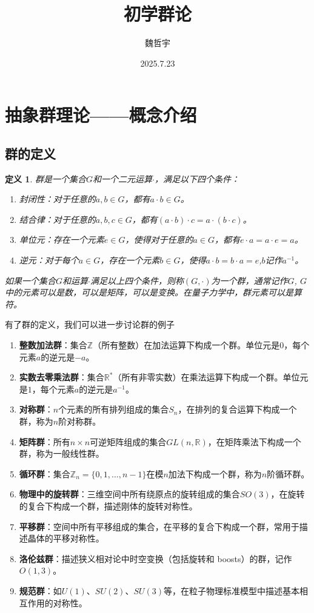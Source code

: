 \documentclass{ctexart}%
\title{初学群论}
\author{魏哲宇}
\date{2025.7.23}
\newtheorem{definition}{定义}
\begin{document}
\maketitle
\tableofcontents

\section{抽象群理论——概念介绍}
\subsection{群的定义}
\begin{definition}
    群是一个集合$G$和一个二元运算$\cdot$，满足以下四个条件：
    \begin{enumerate}
        \item 封闭性：对于任意的$a, b \in G$，都有$a \cdot b \in G$。
        \item 结合律：对于任意的$a, b, c \in G$，都有$(a \cdot b) \cdot c = a \cdot (b \cdot c)$。
        \item 单位元：存在一个元素$e \in G$，使得对于任意的$a \in G$，都有$e \cdot a = a \cdot e = a$。
        \item 逆元：对于每个$a \in G$，存在一个元素$b \in G$，使得$a \cdot b = b \cdot a = e$,$b$记作$a^{-1}$。
    \end{enumerate}
    如果一个集合$G$和运算$\cdot$满足以上四个条件，则称$(G, \cdot)$为一个群，通常记作$G$, $G$中的元素可以是数，可以是矩阵，可以是变换。在量子力学中，群元素可以是算符。
\end{definition}
有了群的定义，我们可以进一步讨论群的例子
\begin{enumerate}
    \item \textbf{整数加法群}：集合$\mathbb{Z}$（所有整数）在加法运算下构成一个群。单位元是$0$，每个元素$a$的逆元是$-a$。
    \item \textbf{实数去零乘法群}：集合$\mathbb{R}^*$（所有非零实数）在乘法运算下构成一个群。单位元是$1$，每个元素$a$的逆元是$a^{-1}$。
    \item \textbf{对称群}：$n$个元素的所有排列组成的集合$S_n$，在排列的复合运算下构成一个群，称为$n$阶对称群。
    \item \textbf{矩阵群}：所有$n\times n$可逆矩阵组成的集合$GL(n, \mathbb{R})$，在矩阵乘法下构成一个群，称为一般线性群。
    \item \textbf{循环群}：集合$\mathbb{Z}_n = \{0,1,\ldots,n-1\}$在模$n$加法下构成一个群，称为$n$阶循环群。
    \item \textbf{物理中的旋转群}：三维空间中所有绕原点的旋转组成的集合$SO(3)$，在旋转的复合下构成一个群，描述刚体的旋转对称性。
    \item \textbf{平移群}：空间中所有平移组成的集合，在平移的复合下构成一个群，常用于描述晶体的平移对称性。
    \item \textbf{洛伦兹群}：描述狭义相对论中时空变换（包括旋转和 boosts）的群，记作$O(1,3)$。
    \item \textbf{规范群}：如$U(1)$、$SU(2)$、$SU(3)$等，在粒子物理标准模型中描述基本相互作用的对称性。
\end{enumerate}
\end{document}
